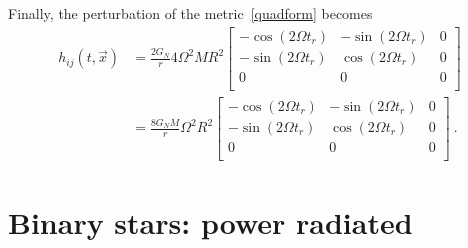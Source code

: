 \documentclass[a4paper]{article}
\begin{document}
    Finally, the perturbation of the metric~\eqref{quadform} becomes 
    \begin{equation}\label{met}
    \begin{aligned}
        h_{ij} (t, \vec x) & = \frac{2 G_N}{r} 4 \Omega^2 MR^2 \begin{bmatrix}
            - \cos (2 \Omega t_r) & -\sin (2 \Omega t_r) & 0 \\
            -\sin (2 \Omega t_r) & \cos (2 \Omega t_r) & 0 \\
            0 & 0 & 0 \\
        \end{bmatrix} \\ & = \frac{8 G_N M}{r} \Omega^2 R^2 \begin{bmatrix}
            - \cos (2 \Omega t_r) & -\sin (2 \Omega t_r) & 0 \\
            -\sin (2 \Omega t_r) & \cos (2 \Omega t_r) & 0 \\
            0 & 0 & 0 \\
        \end{bmatrix} ~.
    \end{aligned}
    \end{equation}

\section{Binary stars: power radiated}
\end{document}
